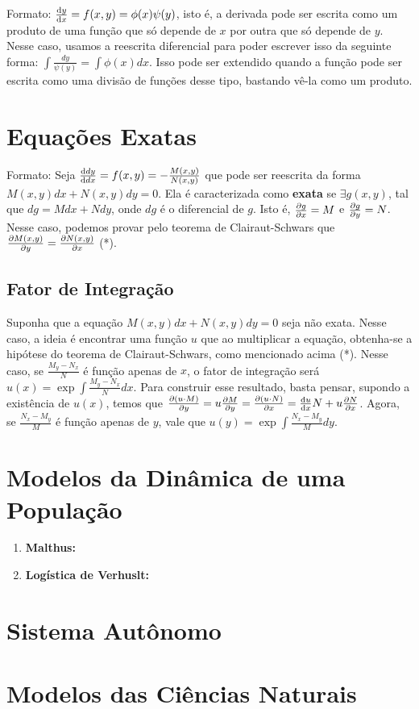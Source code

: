 \documentclass[12pt]{article}
\begin{document}
Formato: $\dv{y}{x} = f(x,y) = \phi(x)\psi(y)$, isto é, a derivada pode ser
escrita como um produto de uma função que só depende de $x$ por outra que só
depende de $y$. Nesse caso, usamos a reescrita diferencial para poder escrever
isso da seguinte forma: $\int \frac{dy}{\psi(y)} = \int \phi(x)dx$. Isso pode
ser extendido quando a função pode ser escrita como uma divisão de funções
desse tipo, bastando vê-la como um produto.  

\section{Equações Exatas}

Formato: Seja $\dv{dy}{dx} = f(x,y) = - \frac{M(x,y)}{N(x,y)}$ que pode ser
reescrita da forma $M(x,y)dx + N(x,y)dy = 0$. Ela é caracterizada como
\textbf{exata} se $\exists g(x,y)$, tal que $dg = Mdx + Ndy$, onde $dg$ é o
diferencial de $g$. Isto é, $\pdv{g}{x} = M$ e $\pdv{g}{y} = N$. Nesse caso,
podemos provar pelo teorema de Clairaut-Schwars que $\pdv{M(x,y)}{y} =
\pdv{N(x,y)}{x}$ (*). 

\subsection{Fator de Integração}

Suponha que a equação $M(x,y)dx + N(x,y)dy = 0$ seja não exata. Nesse caso, a
ideia é encontrar uma função $u$ que ao multiplicar a equação, obtenha-se a
hipótese do teorema de Clairaut-Schwars, como mencionado acima (*). Nesse
caso, se $\frac{M_y - N_x}{N}$ é função apenas de $x$, o fator de integração
será $u(x) = \exp{\int \frac{M_y - N_x}{N}dx}$. Para construir esse resultado,
basta pensar, supondo a existência de $u(x)$, temos que $\pdv{(u\cdot M)}{y} =
u\pdv{M}{y} = \pdv{(u\cdot N)}{x} = \dv{u}{x}N + u\pdv{N}{x}$. Agora, se $\frac{N_x
- M_y}{M}$ é função apenas de $y$, vale que $u(y) = \exp{\int \frac{N_x -
M_y}{M}dy}$. 

\section{Modelos da Dinâmica de uma População}

\begin{enumerate}
    \item \textbf{Malthus:} 
    \item \textbf{Logística de Verhuslt: }
\end{enumerate}

\section{Sistema Autônomo}

\section{Modelos das Ciências Naturais}
\end{document}
